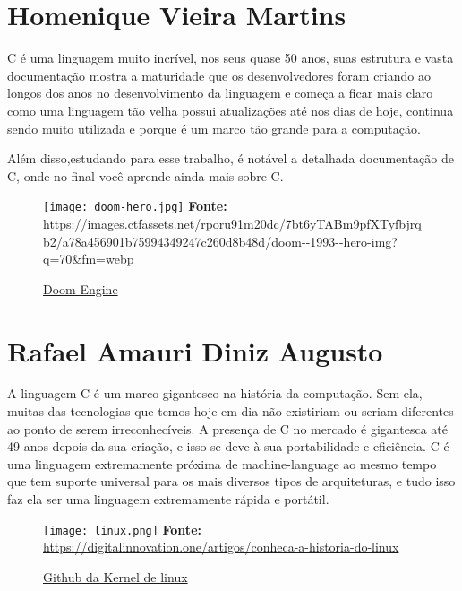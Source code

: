 \begin{apendicesenv}
      
    \partapendices

    \setcounter{chapter}{0}
    \renewcommand{\thechapter}{\Alph{chapter}}%
    
    \chapter{Homenique Vieira Martins}
    C é uma linguagem muito incrível, nos seus quase 50 anos, 
    suas estrutura e vasta documentação mostra a maturidade que
     os desenvolvedores foram criando ao longos dos anos no desenvolvimento
    da linguagem e começa a ficar mais claro como uma linguagem tão velha possui
     atualizações até nos dias de hoje, continua sendo muito utilizada e porque é
      um marco tão grande para a computação. 

    Além disso,estudando para esse trabalho, é notável a detalhada documentação de C,
     onde no final você aprende ainda mais sobre C.

     \begin{figure}[ht]
        \caption{\href{https://github.com/id-Software/DOOM}{Doom Engine}}
        \texttt{[image: doom-hero.jpg]}
        \textbf{Fonte:} \url{https://images.ctfassets.net/rporu91m20dc/7bt6yTABm9pfXTyfbjrqb2/a78a456901b75994349247c260d8b48d/doom--1993--hero-img?q=70&fm=webp} 
      \end{figure}

    \nocite{Doom}
    \newpage


       
    \newpage
    \chapter{Rafael Amauri Diniz Augusto}

    A linguagem C é um marco gigantesco na história da computação.
    Sem ela, muitas das tecnologias que temos hoje em dia não existiriam 
    ou seriam diferentes ao ponto de serem irreconhecíveis. A presença de
    C no mercado é gigantesca até 49 anos depois da sua criação, e isso se
    deve à sua portabilidade e eficiência. C é uma linguagem extremamente 
    próxima de machine-language ao mesmo tempo que tem suporte universal 
    para os mais diversos tipos de arquiteturas, e tudo isso faz ela ser
    uma linguagem extremamente rápida e portátil. 

    \begin{figure}[ht]
        \caption{\href{https://github.com/torvalds/linux}{Github da Kernel de linux }}
        \texttt{[image: linux.png]}
        \textbf{Fonte:} \url{https://digitalinnovation.one/artigos/conheca-a-historia-do-linux}
        \nocite{KernelLinux}
    \end{figure}
    
  
    \newpage
    


\end{apendicesenv}